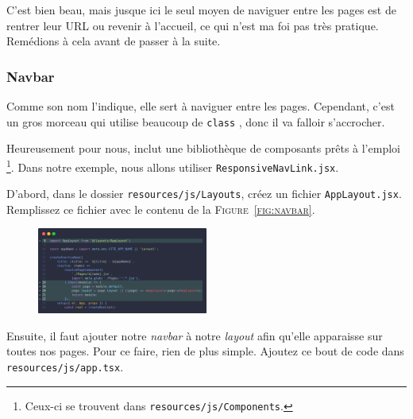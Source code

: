 C'est bien beau, mais jusque ici le seul moyen de naviguer entre les pages est de rentrer leur URL ou revenir à l'accueil, ce qui n'est ma foi pas très pratique. Remédions à cela avant de passer à la suite.

\subsubsection[Navbar]{Navbar}\label{sec:navbar}



Comme son nom l'indique, elle sert à naviguer entre les pages. Cependant, c'est un gros morceau qui utilise beaucoup de \verb|class| \tailwind{}, donc il va falloir s'accrocher.

Heureusement pour nous, \react{} inclut une bibliothèque de composants prêts à l'emploi \footnote{Ceux-ci se trouvent dans \texttt{resources/js/Components}.}. Dans notre exemple, nous allons utiliser \texttt{ResponsiveNavLink.jsx}.

D'abord, dans le dossier \verb|resources/js/Layouts|, créez un fichier \verb|AppLayout.jsx|. Remplissez ce fichier avec le contenu de la \textsc{Figure~\ref{fig:navbar}}.

\begin{figure}
    \vspace{-1.2cm}
    \includegraphics[width=0.5\textwidth]{figures-C1/app.jsx.png}
\end{figure}

\enlargethispage{2\baselineskip}

Ensuite, il faut ajouter notre \textit{navbar} à notre \textit{layout} afin qu'elle apparaisse sur toutes nos pages. Pour ce faire, rien de plus simple. Ajoutez ce bout de code dans \texttt{resources/js/app.tsx}.

